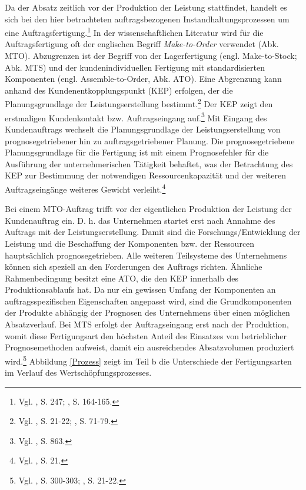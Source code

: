 Da der Absatz zeitlich vor der Produktion der Leistung stattfindet, handelt es sich bei den hier betrachteten auftragsbezogenen Instandhaltungsprozessen um eine Auftragsfertigung.\footnote{Vgl. \cite{hax1956industriebetrieb}, S. 247; \cite{Gutenberg1965dispos}, S. 164-165.} In der wissenschaftlichen Literatur wird für die Auftragsfertigung oft der englischen Begriff \textit{Make-to-Order} verwendet (Abk. MTO). Abzugrenzen ist der Begriff von der Lagerfertigung (engl. Make-to-Stock; Abk. MTS) und der kundenindividuellen Fertigung mit standardisierten Komponenten (engl. Assemble-to-Order, Abk. ATO). 
Eine Abgrenzung kann anhand des Kundenentkopplungspunkt (KEP) erfolgen, der die Planungsgrundlage der Leistungserstellung bestimmt.\footnote{Vgl. \cite{quante2009management}, S. 21-22; \cite{sharman1984rediscovery}, S. 71-79.} Der KEP zeigt den erstmaligen Kundenkontakt bzw. Auftragseingang auf.\footnote{Vgl. \cite{Olhager2010863}, S. 863.} Mit Eingang des Kundenauftrags wechselt die Planungsgrundlage der Leistungserstellung von prognosegetriebener hin zu auftragsgetriebener Planung. Die prognosegetriebene Planungsgrundlage für die Fertigung ist mit einem Prognosefehler für die Ausführung der unternehmerischen Tätigkeit behaftet, was der Betrachtung des KEP zur Bestimmung der notwendigen Ressourcenkapazität und der weiteren Auftragseingänge weiteres Gewicht verleiht.\footnote{Vgl. \cite{quante2009management}, S. 21.} 

Bei einem MTO-Auftrag trifft vor der eigentlichen Produktion der Leistung der Kundenauftrag ein. D. h. das Unternehmen startet erst nach Annahme des Auftrags mit der Leistungserstellung. Damit sind die Forschungs/Entwicklung der Leistung und die Beschaffung der Komponenten bzw. der Ressourcen hauptsächlich prognosegetrieben. Alle weiteren Teilsysteme des Unternehmens können sich speziell an den Forderungen des Auftrags richten. Ähnliche Rahmenbedingung besitzt eine ATO, die den KEP innerhalb des Produktionsablaufs hat. Da nur ein gewissen Umfang der Komponenten an auftragsspezifischen Eigenschaften angepasst wird, sind die Grundkomponenten der Produkte abhängig der Prognosen des Unternehmens über einen möglichen Absatzverlauf. Bei MTS erfolgt der Auftragseingang erst nach der Produktion, womit diese Fertigungsart den höchsten Anteil des Einsatzes von betrieblicher Prognosemethoden aufweist, damit ein ausreichendes Absatzvolumen produziert wird.\footnote{Vgl. \cite{fleischmeyr2004codp}, S. 300-303; \cite{quante2009management}, S. 21-22.} Abbildung \ref{Prozess} zeigt im Teil b die Unterschiede der Fertigungsarten im Verlauf des Wertschöpfungsprozesses. 

